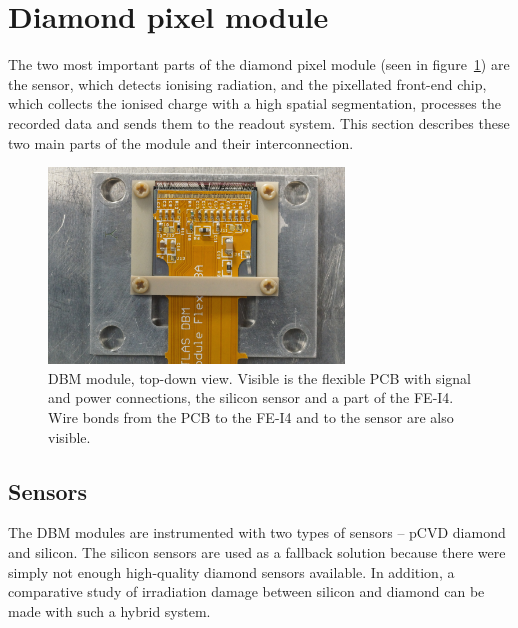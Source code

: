 \section{Diamond pixel module}
\label{sec:atlasdbm}
The two most important parts of the diamond pixel module (seen in figure~\ref{fig:dbmmodule}) are the sensor, which detects ionising radiation, and the pixellated front-end chip, which collects the ionised charge with a high spatial segmentation, processes the recorded data and sends them to the readout system. This section describes these two main parts of the module and their interconnection.
\begin{figure}[!t]
\centering
\includegraphics[width=0.7\textwidth]{04_charge_monitoring/pics/mod1}
\caption{DBM module, top-down view. Visible is the flexible PCB with signal and power connections, the silicon sensor and a part of the FE-I4. Wire bonds from the PCB to the FE-I4 and to the sensor are also visible.}
\label{fig:dbmmodule}
\end{figure}
\subsection{Sensors}
The DBM modules are instrumented with two types of sensors -- pCVD diamond and silicon. The silicon sensors are used as a fallback solution because there were simply not enough high-quality diamond sensors available. In addition, a comparative study of irradiation damage between silicon and diamond can be made with such a hybrid system.

